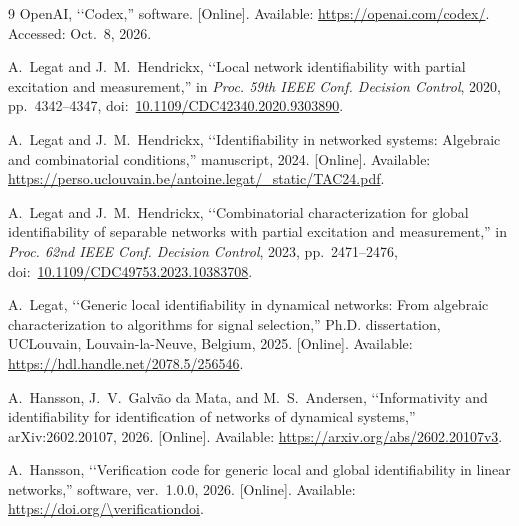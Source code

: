 \documentclass[letterpaper,10pt,conference]{ieeeconf}
\begin{document}
\begin{thebibliography}{9}
OpenAI, \lq\lq Codex,'' software.
[Online]. Available: \url{https://openai.com/codex/}.
Accessed: Oct.~8, 2026.

A.~Legat and J.~M.~Hendrickx, \lq\lq Local network identifiability with
partial excitation and measurement,'' in \emph{Proc. 59th IEEE Conf.
Decision Control}, 2020, pp.~4342--4347,
doi:~\href{https://doi.org/10.1109/CDC42340.2020.9303890}
{10.1109/CDC42340.2020.9303890}.

A.~Legat and J.~M.~Hendrickx, \lq\lq Identifiability in networked systems:
Algebraic and combinatorial conditions,'' manuscript, 2024.
[Online]. Available:
\url{https://perso.uclouvain.be/antoine.legat/_static/TAC24.pdf}.

A.~Legat and J.~M.~Hendrickx, \lq\lq Combinatorial characterization for
global identifiability of separable networks with partial excitation
and measurement,'' in \emph{Proc. 62nd IEEE Conf. Decision Control},
2023, pp.~2471--2476,
doi:~\href{https://doi.org/10.1109/CDC49753.2023.10383708}
{10.1109/CDC49753.2023.10383708}.

A.~Legat, \lq\lq Generic local identifiability in dynamical networks: From
algebraic characterization to algorithms for signal selection,''
Ph.D. dissertation, UCLouvain, Louvain-la-Neuve, Belgium, 2025.
[Online]. Available: \url{https://hdl.handle.net/2078.5/256546}.

A.~Hansson, J.~V.~Galv{\~a}o da Mata, and M.~S.~Andersen,
\lq\lq Informativity and identifiability for identification of
networks of dynamical systems,'' arXiv:2602.20107, 2026.
[Online]. Available: \url{https://arxiv.org/abs/2602.20107v3}.

\ifdefined\verificationdoi
{}
A.~Hansson, \lq\lq Verification code for generic local and global
identifiability in linear networks,'' software, ver.~1.0.0, 2026.
[Online]. Available: \url{https://doi.org/\verificationdoi}.
\fi
\end{thebibliography}
\end{document}

